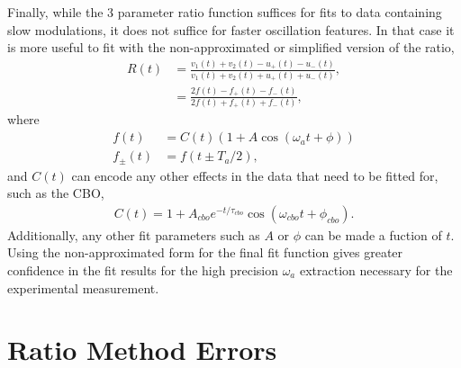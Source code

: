 Finally, while the 3 parameter ratio function suffices for fits to data containing slow modulations, it does not suffice for faster oscillation features. In that case it is more useful to fit with the non-approximated or simplified version of the ratio,
	\begin{equation}	
	\begin{aligned}
		R(t) &= \frac{v_{1}(t) + v_{2}(t) - u_{+}(t) - u_{-}(t)}{v_{1}(t) + v_{2}(t) + u_{+}(t) + u_{-}(t)}, \\ 
			 &= \frac{2f(t) - f_{+}(t) - f_{-}(t)}{2f(t) + f_{+}(t) + f_{-}(t)},
	\end{aligned}
	\end{equation}
where
	\begin{equation}	
	\begin{aligned}
		f(t) &= C(t) (1 + A \cos(\omega_{a}t + \phi)) \\ 
		f_{\pm}(t) &= f(t \pm T_{a}/2),
	\end{aligned}
	\end{equation}
and $C(t)$ can encode any other effects in the data that need to be fitted for, such as the CBO,
	\begin{align}
		C(t) = 1 + A_{cbo} e^{-t/\tau_{cbo}} \cos(\omega_{cbo}t + \phi_{cbo}).
	\end{align}
Additionally, any other fit parameters such as $A$ or $\phi$ can be made a fuction of $t$. Using the non-approximated form for the final fit function gives greater confidence in the fit results for the high precision $\omega_{a}$ extraction necessary for the experimental measurement.


\chapter{Ratio Method Errors}
